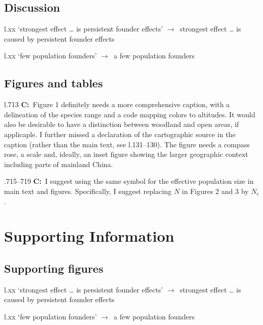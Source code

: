 \documentclass[11pt]{article}
\newenvironment{my_description}
{\begin{description}
  \setlength{\itemsep}{2pt}
  \setlength{\parskip}{0pt}
  \setlength{\parsep}{0pt}}
{\end{description}}
\newcommand{\ra}{$\rightarrow$\ }
\newcommand{\C}{\textbf{C:}\ }
\begin{document}
\subsection{Discussion}

\begin{my_description}
	\item[l.xx] `strongest effect \ldots{} is persistent founder effects' \ra strongest effect \ldots{} is caused by persistent founder effects
	\item[l.xx] `few population founders' \ra a few population founders
\end{my_description}
	

\subsection{Figures and tables}

\begin{my_description}
	\item[l.713] \C Figure 1 definitely needs a more comprehensive caption, with a delineation of the species range and a code mapping colors to altitudes. It would also be desirable to have a distinction between woodland and open areas, if applicaple. I further missed a declaration of the cartographic source in the caption (rather than the main text, see l.131--130). The figure needs a compass rose, a scale and, ideally, an inset figure showing the larger geographic context including parts of mainland China.
	\item[.715--719] \C I suggest using the same symbol for the effective population size in main text and figures. Specifically, I suggest replacing $N$ in Figures 2 and 3 by $N_e$.
	
\end{my_description}


\section{Supporting Information}

\subsection{Supporting figures}

\begin{my_description}
	\item[l.xx] `strongest effect \ldots{} is persistent founder effects' \ra strongest effect \ldots{} is caused by persistent founder effects
	\item[l.xx] `few population founders' \ra a few population founders
\end{my_description}



\end{document}
